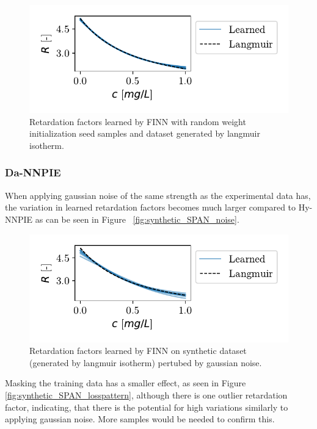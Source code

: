 \begin{figure}[h]
    \centering
    \includegraphics{figs/finn_synthetic_SPAN_seed.pdf}
    \caption{Retardation factors learned by FINN with random weight initialization seed samples and dataset generated by langmuir isotherm.}
    \label{fig:synthetic_SPAN_seed}
\end{figure}



\subsubsection{Da-NNPIE}
When applying gaussian noise of the same strength as the experimental data has, the variation in learned retardation factors becomes much larger compared to Hy-NNPIE as can be seen in Figure ~\vref{fig:synthetic_SPAN_noise}.

\begin{figure}[h]
    \centering
    \includegraphics{figs/finn_synthetic_SPAN_noise.pdf}
    \caption{Retardation factors learned by FINN on synthetic dataset (generated by langmuir isotherm) pertubed by gaussian noise.}
    \label{fig:synthetic_SPAN_noise}
\end{figure}


Masking the training data has a smaller effect, as seen in Figure \vref{fig:synthetic_SPAN_losspattern}, although there is one outlier retardation factor, indicating, that there is the potential for high variations similarly to applying gaussian noise. More samples would be needed to confirm this.

